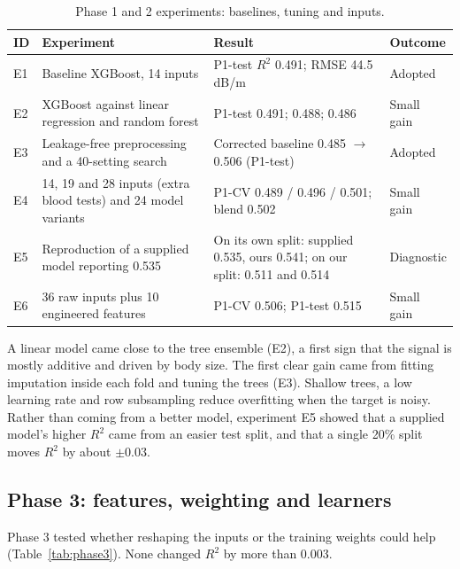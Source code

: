 \begin{table}[t]
\centering
\small
\caption{Phase 1 and 2 experiments: baselines, tuning and inputs.}
\label{tab:phase12}
\begin{tabularx}{\textwidth}{@{}l Y Y l@{}}
\toprule
ID & Experiment & Result & Outcome \\
\midrule
E1 & Baseline XGBoost, 14 inputs & P1-test $R^2$ 0.491; RMSE 44.5\,dB/m & Adopted \\
E2 & XGBoost against linear regression and random forest & P1-test 0.491; 0.488; 0.486 & Small gain \\
E3 & Leakage-free preprocessing and a 40-setting search & Corrected baseline 0.485 $\rightarrow$ 0.506 (P1-test) & Adopted \\
E4 & 14, 19 and 28 inputs (extra blood tests) and 24 model variants & P1-CV 0.489 / 0.496 / 0.501; blend 0.502 & Small gain \\
E5 & Reproduction of a supplied model reporting 0.535 & On its own split: supplied 0.535, ours 0.541; on our split: 0.511 and 0.514 & Diagnostic \\
E6 & 36 raw inputs plus 10 engineered features & P1-CV 0.506; P1-test 0.515 & Small gain \\
\bottomrule
\end{tabularx}
\end{table}

A linear model came close to the tree ensemble (E2), a first sign that the signal is mostly additive and driven by body size. The first clear gain came from fitting imputation inside each fold and tuning the trees (E3). Shallow trees, a low learning rate and row subsampling reduce overfitting when the target is noisy. Rather than coming from a better model, experiment E5 showed that a supplied model's higher $R^2$ came from an easier test split, and that a single 20\% split moves $R^2$ by about $\pm 0.03$.

\subsection{Phase 3: features, weighting and learners}

Phase 3 tested whether reshaping the inputs or the training weights could help (Table~\ref{tab:phase3}). None changed $R^2$ by more than 0.003.

